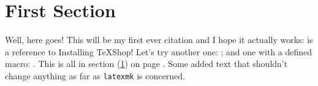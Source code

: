 \documentclass{article}
\begin{document}
\section{First Section}
\label{sec:first}\label{firstsec}

Well, here goes! This will be my first ever citation and I hope it actually works: \cite{Nichols:TB4-2-75} is a reference to Installing \TeX Shop! Let's try another one: \cite{Skoupy:TB23-1-106}; and one with a defined macro: \cite{Nichols:TB2-3-32}\cite{Nichols:TB4-2-75}\cite{Nichols:TB5-1-29}.\cite{Koch:TB22-3-240}\cite{Skoupy:TB23-1-106}
This is all in section (\ref{sec:first}) on page \pageref{sec:first}. Some added text that shouldn't change anything as far as \texttt{latexmk} is concerned.\cite{Beebe:TB4-1-11}\cite{Beebe:TB12-3-351}\cite{Koch:TB22-3-240}\cite{Beebe:TB12-3-351}\cite{Abbott:TB13-3-357}\cite{Nichols:TB3-2-23}\cite{Nichols:TB4-1-22}\cite{Beebe:TB19-1-12}\cite{Koch:TB22-3-240}\cite{Beebe:TB11-4-490}\cite{Beeton:TB3-2-25}


\end{document}
